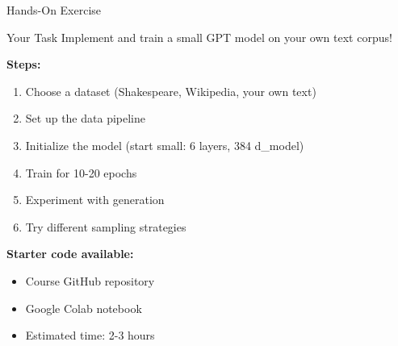 \documentclass[aspectratio=169]{beamer}
\begin{document}
\begin{frame}[shrink=10]{Hands-On Exercise 💪}
    \begin{alertblock}{Your Task}
        Implement and train a small GPT model on your own text corpus!
    \end{alertblock}

    \vspace{0.3cm}

    \textbf{Steps:}
    \begin{enumerate}\setlength{\itemsep}{0pt}
        \item Choose a dataset (Shakespeare, Wikipedia, your own text)
        \item Set up the data pipeline
        \item Initialize the model (start small: 6 layers, 384 d\_model)
        \item Train for 10-20 epochs
        \item Experiment with generation
        \item Try different sampling strategies
    \end{enumerate}

    \vspace{0.3cm}

    \textbf{Starter code available:}
    \begin{itemize}\setlength{\itemsep}{0pt}
        \item Course GitHub repository
        \item Google Colab notebook
        \item Estimated time: 2-3 hours
    \end{itemize}
\end{frame}
\end{document}
